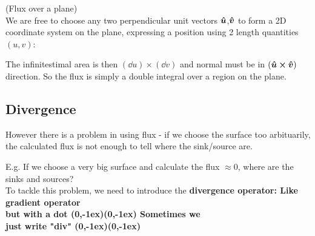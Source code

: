 \documentclass[class=article, crop=false, 12pt]{standalone}
\begin{document}
\begin{example}
    (Flux over a plane)\\
    We are free to choose any two perpendicular unit vectors $\vu*{u}$,$\vu*{v}$ 
    to form a 2D coordinate system on the plane, 
    expressing a position using 2 length quantities $(u,v)$:


    The infinitestimal area is then $(\dd{u})\times(\dd{v})$
    and normal must be in $(\vu*{u}\cross\vu*{v})$ direction.
    So the flux is simply a double integral over a region on the plane.


\end{example}


\subsection{Divergence}

However there is a problem in using flux - 
if we choose the surface too arbituarily, 
the calculated flux is not enough to tell where the sink/source are.

E.g. If we choose a very big surface and calculate the flux $\approx 0$, 
where are the sinks and sources?\\

To tackle this problem,
we need to introduce the \bf{divergence} operator:
{\scriptsize Like gradient operator\\[-1ex]\scriptsize but with a dot}
{(0,-1ex)}{(0,-1ex)}
{\scriptsize Sometimes we\\[-1ex]\scriptsize just write "div"}
{(0,-1ex)}{(0,-1ex)}
\end{document}
